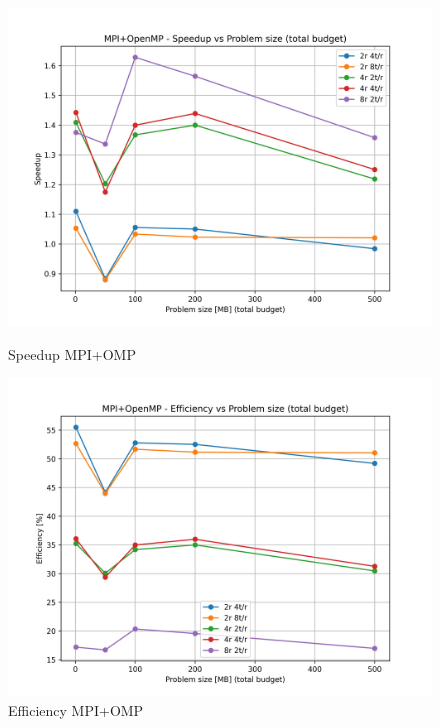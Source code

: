 			\begin{figure}[H]
				\centering
				\begin{minipage}[t]{0.49\textwidth}
					\centering
					\includegraphics[width=\textwidth]{img/mpi_omp_plots/mpi_omp_speedup.jpg}
					\caption{Speedup MPI+OMP}
					\label{fig:mpi_omp_speedup}
				\end{minipage}
				\hfill
				\begin{minipage}[t]{0.49\textwidth}
					\centering
					\includegraphics[width=\textwidth]{img/mpi_omp_plots/mpi_omp_efficiency.jpg}
					\caption{Efficiency MPI+OMP}
					\label{fig:mpi_omp_efficiency}
				\end{minipage}
			\end{figure}
			

